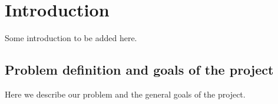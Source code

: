 \section{Introduction}

Some introduction to be added here.

\subsection{Problem definition and goals of the project}

Here we describe our problem and the general goals of the project.